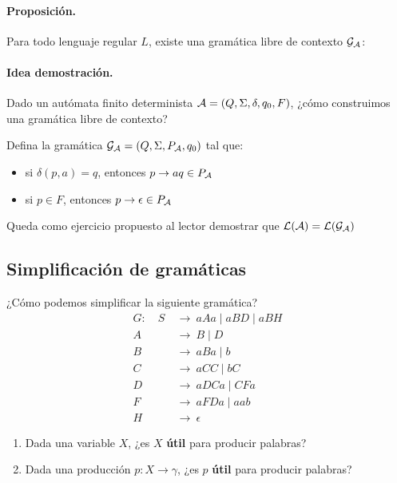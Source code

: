 \paragraph{Proposición.} Para todo lenguaje regular $L$, existe una gramática libre de contexto $\mathcal{G}_{\mathcal{A}}$:

\paragraph{Idea demostración.} Dado un autómata finito determinista $\mathcal{A} = (Q, \Sigma, \delta, q_0, F)$, ¿cómo construimos una gramática libre de contexto? \medbreak

Defina la gramática $\mathcal{G}_{\mathcal{A}} = (Q, \Sigma, P_{\mathcal{A}}, q_0)$ tal que:
\begin{itemize}
    \item si $\delta(p,a) = q$, entonces $p \to aq \in P_{\mathcal{A}}$
    \item si $p \in F$, entonces $p \to \epsilon \in P_{\mathcal{A}}$
\end{itemize}

Queda como ejercicio propuesto al lector demostrar que $\mathcal{L}(\mathcal{A}) = \mathcal{L}(\mathcal{G}_{\mathcal{A}})$

\subsection{Simplificación de gramáticas}

¿Cómo podemos simplificar la siguiente gramática?
\begin{align*}
    G: \quad S \  & \to \ aAa \mid aBD \mid aBH \\
    A \           & \to \ B \mid D              \\
    B \           & \to \ aBa \mid b            \\
    C \           & \to \ aCC \mid bC           \\
    D \           & \to \ aDCa \mid CFa         \\
    F \           & \to \ aFDa \mid aab         \\
    H \           & \to \ \epsilon
\end{align*}
\begin{enumerate}
    \item Dada una variable $X$, ¿es $X$ \textbf{útil} para producir palabras?
    \item Dada una producción $p:X \to \gamma$, ¿es $p$ \textbf{útil} para producir palabras?
\end{enumerate}

